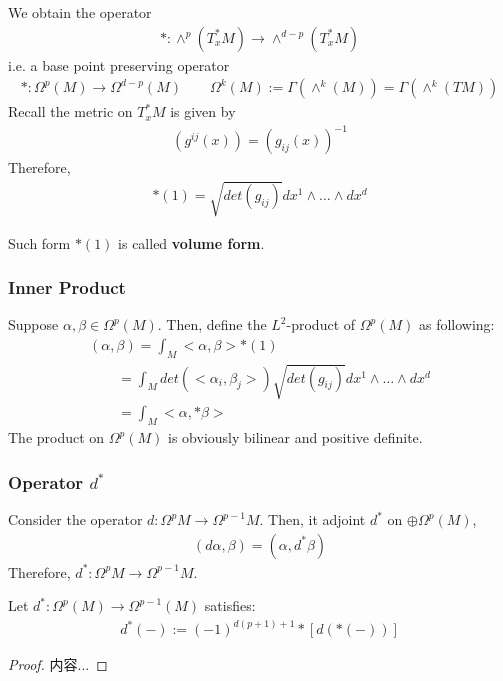 \documentclass[Total.tex]{subfiles}
\begin{document}
			We obtain the operator
			\begin{gather*}
				*:\wedge^p(T_x^*M)\rightarrow \wedge^{d-p}(T_x^* M)
			\end{gather*}
			i.e. a base point preserving operator
			\begin{gather*}
				*:\Omega^p(M)\rightarrow \Omega^{d-p}(M)\qquad \Omega^k(M):=\Gamma(\wedge^k(M))=\Gamma(\wedge^k (TM))
			\end{gather*}
			Recall the metric on $T_x^*M$ is given by
			\begin{gather*}
				(g^{ij}(x))=(g_{ij}(x))^{-1}
			\end{gather*}
			Therefore,
			\begin{gather*}
				*(1)=\sqrt{det(g_{ij})}dx^1\wedge \dots\wedge dx^d
			\end{gather*}
			
			\begin{Def}
				Such form $*(1)$ is called \textbf{volume form}.
			\end{Def}
			\subsubsection{Inner Product}
				\begin{Def}
					Suppose $\alpha,\beta\in \Omega^p(M)$. Then, define the $L^2$-product of $\Omega^p(M)$ as following:
					\begin{gather*}
						(\alpha,\beta)=\int_M <\alpha,\beta>*(1)\\
						\qquad=\int_M det(<\alpha_i,\beta_j>)\sqrt{det(g_{ij})}dx^1\wedge\dots\wedge dx^d\\
						\qquad=\int_M <\alpha,*\beta>
					\end{gather*}
					The product on $\Omega^p(M)$ is obviously bilinear and positive definite.
				\end{Def}
			\subsubsection{Operator $d^*$}
				\begin{Def}
					Consider the operator $d:\Omega^{p} M\rightarrow \Omega^{p-1}M$. Then, it adjoint $d^*$ on $\oplus \Omega^{p}(M)$,
					\begin{gather*}
						(d\alpha,\beta)=(\alpha,d^*\beta)
					\end{gather*}
					Therefore, $d^*:\Omega^pM\rightarrow \Omega^{p-1}M$.
				\end{Def}
				
				\begin{lemma}
					Let $d^*:\Omega^{p}(M)\rightarrow \Omega^{p-1}(M)$ satisfies:
					\begin{gather*}
						d^*(-):=(-1)^{d(p+1)+1}*[d(*(-))]
					\end{gather*}
				\end{lemma}
				\begin{proof}
					内容...
				\end{proof}
\end{document}
